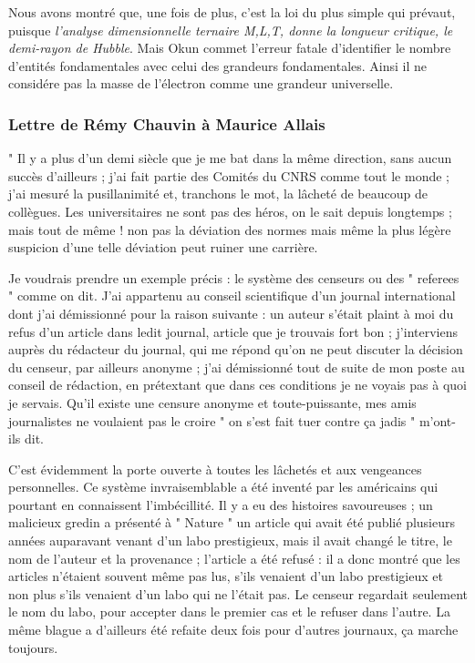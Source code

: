 \documentclass[a4paper,12pt]{article}
\begin{document}
Nous avons montré que, une fois de plus, c'est la loi du plus simple qui prévaut, puisque \textit{l'analyse dimensionnelle ternaire M,L,T, donne la longueur critique, le demi-rayon de Hubble}. Mais Okun commet l'erreur fatale d'identifier le nombre d'entités fondamentales avec celui des grandeurs fondamentales. Ainsi il ne considére pas la masse de l'électron comme une grandeur universelle.



\subsubsection {Lettre de Rémy Chauvin à Maurice Allais}

" Il y a plus d’un demi siècle que je me bat dans la même direction, sans aucun succès d’ailleurs ; j’ai fait partie des Comités du CNRS comme tout le monde ; j’ai mesuré la pusillanimité et, tranchons le mot, la lâcheté de beaucoup de collègues. Les universitaires ne sont pas des héros, on le sait depuis longtemps ; mais tout de même ! non pas la déviation des normes mais même la plus légère suspicion d’une telle déviation peut ruiner une carrière. 

Je voudrais prendre un exemple précis : le système des censeurs ou des " referees " comme on dit. J’ai appartenu au conseil scientifique d’un journal international dont j’ai démissionné pour la raison suivante : un auteur s’était plaint à moi du refus d’un article dans ledit journal, article que je trouvais fort bon ; j’interviens auprès du rédacteur du journal, qui me répond qu’on ne peut discuter la décision du censeur, par ailleurs anonyme ; j’ai démissionné tout de suite de mon poste au conseil de rédaction, en prétextant que dans ces conditions je ne voyais pas à quoi je servais. 
Qu’il existe une censure anonyme et toute-puissante, mes amis journalistes ne voulaient pas le croire " on s’est fait tuer contre ça jadis " m’ont-ils dit.


C’est évidemment la porte ouverte à toutes les lâchetés et aux vengeances personnelles. Ce système invraisemblable a été inventé par les américains qui pourtant en connaissent l’imbécillité. Il y a eu des histoires savoureuses ; un malicieux gredin a présenté à " Nature " un article qui avait été publié plusieurs années auparavant venant d’un labo prestigieux, mais il avait changé le titre, le nom de l’auteur et la provenance ; l’article a été refusé : il a donc montré que les articles n’étaient souvent même pas lus, s’ils venaient d’un labo prestigieux et non plus s’ils venaient d’un labo qui ne l’était pas. Le censeur regardait seulement le nom du labo, pour accepter dans le premier cas et le refuser dans l’autre. La même blague a d’ailleurs été refaite deux fois pour d’autres journaux, ça marche toujours.
\end{document}
